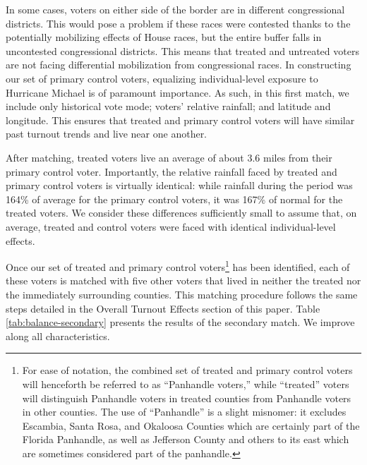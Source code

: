 \documentclass[
  12pt,
]{article}
\begin{document}
In some cases, voters on either side of the border are in different congressional districts. This would pose a problem if these races were contested thanks to the potentially mobilizing effects of House races, but the entire buffer falls in uncontested congressional districts. This means that treated and untreated voters are not facing differential mobilization from congressional races. In constructing our set of primary control voters, equalizing individual-level exposure to Hurricane Michael is of paramount importance. As such, in this first match, we include only historical vote mode; voters' relative rainfall; and latitude and longitude. This ensures that treated and primary control voters will have similar past turnout trends and live near one another.

After matching, treated voters live an average of about 3.6 miles from their primary control voter. Importantly, the relative rainfall faced by treated and primary control voters is virtually identical: while rainfall during the period was 164\% of average for the primary control voters, it was 167\% of normal for the treated voters. We consider these differences sufficiently small to assume that, on average, treated and control voters were faced with identical individual-level effects.

Once our set of treated and primary control voters\footnote{For ease of notation, the combined set of treated and primary control voters will henceforth be referred to as ``Panhandle voters,'' while ``treated'' voters will distinguish Panhandle voters in treated counties from Panhandle voters in other counties. The use of ``Panhandle'' is a slight misnomer: it excludes Escambia, Santa Rosa, and Okaloosa Counties which are certainly part of the Florida Panhandle, as well as Jefferson County and others to its east which are sometimes considered part of the panhandle.} has been identified, each of these voters is matched with five other voters that lived in neither the treated nor the immediately surrounding counties. This matching procedure follows the same steps detailed in the Overall Turnout Effects section of this paper. Table \ref{tab:balance-secondary} presents the results of the secondary match. We improve along all characteristics.
\end{document}
